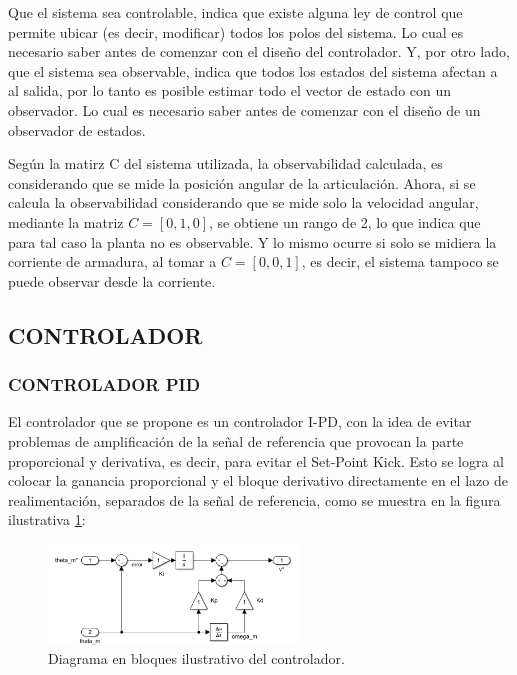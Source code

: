 \documentclass{article}
\begin{document}
\begin{sloppypar}
Que el sistema sea controlable, indica que existe alguna ley de control que permite ubicar (es decir, modificar) todos los polos del sistema. Lo cual es necesario saber antes de comenzar con el diseño del controlador.
Y, por otro lado, que el sistema sea observable, indica que todos los estados del sistema afectan a al salida, por lo tanto es posible estimar todo el vector de estado con un observador. Lo cual es necesario saber antes de comenzar con el diseño de un observador de estados.

Según la matirz C del sistema utilizada, la observabilidad calculada, es considerando que se mide la posición angular de la articulación.
Ahora, si se calcula la observabilidad considerando que se mide solo la velocidad angular, mediante la matriz $C=[0, 1, 0]$, se obtiene un rango de 2, lo que indica que para tal caso la planta no es observable. Y lo mismo ocurre si solo se midiera la corriente de armadura, al tomar a $C=[0, 0, 1]$, es decir, el sistema tampoco se puede observar desde la corriente.


\subsection{CONTROLADOR}
\label{sec:CONTROLADOR}

\subsubsection{CONTROLADOR PID}
\label{sec:CONTROLADOR PID}

El controlador que se propone es un controlador I-PD, con la idea de evitar problemas de amplificación de la señal de referencia que provocan la parte proporcional y derivativa, es decir, para evitar el Set-Point Kick. Esto se logra al colocar la ganancia proporcional y el bloque derivativo directamente en el lazo de realimentación, separados de la señal de referencia, como se muestra en la figura ilustrativa \ref{fig:Diagrama en bloques ilustrativo del controlador}:

\begin{figure}[H]
    \centering
    \includegraphics[width=0.60\textwidth]{Diagrama en bloques ilustrativo del controlador}
    \caption{Diagrama en bloques ilustrativo del controlador.}
    \label{fig:Diagrama en bloques ilustrativo del controlador}
\end{figure}


\end{sloppypar}
\end{document}
